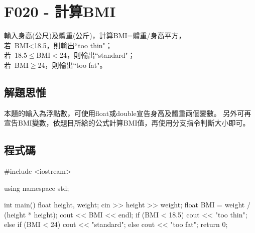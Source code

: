 \section{F020 - 計算BMI}
輸入身高(公尺)及體重(公斤)，計算BMI=體重/身高平方，\\
若\ BMI<18.5，則輸出``too thin"；\\
若\ 18.5$\le$BMI$<$24，則輸出``standard"；\\
若\ BMI$\ge$24，則輸出``too fat"。
\subsection{解題思惟}
本題的輸入為浮點數，可使用float或double宣告身高及體重兩個變數。
另外可再宣告BMI變數，依題目所給的公式計算BMI值，再使用分支指令判斷大小即可。

\subsection{程式碼}
\begin{cppcode}
#include <iostream>

using namespace std;

int main()
{
	float height, weight;
	cin >> height >> weight;
	float BMI = weight / (height * height);
	cout << BMI << endl;
	if (BMI < 18.5) cout << "too thin";
	else if (BMI < 24) cout << "standard";
	else cout << "too fat";
	return 0;
}
\end{cppcode}
